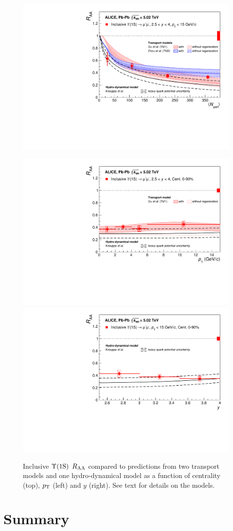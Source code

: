 \begin{figure}[!t]
\begin{center}
\includegraphics[width=0.5\linewidth]{Chapters/Analysis/Figs/RAA_Cent_ALICE2015_Rapp_Zhou_Strickland_style3.pdf} \\
\end{center}
\includegraphics[width=0.5\linewidth]{Chapters/Analysis/Figs/RAA_Pt_ALICE2015_Rapp_Strickland_style3.pdf}
\includegraphics[width=0.5\linewidth]{Chapters/Analysis/Figs/RAA_Y_ALICE2015_Strickland_style3.pdf}
\caption{Inclusive $\mbox{$\Upsilon$(1S)}$ $\mbox{$R_{\rm{AA}}$}$ compared to predictions from two transport models \cite{Du:2017qkv,Zhou:2014hwa} and one hydro-dynamical model \cite{Krouppa:2017jlg} as a function of centrality (top), $\mbox{$p_{\rm T}$}$ (left) and $y$ (right). See text for details on the models.}
\label{fig:raa_models}
\end{figure}

\section{Summary}

